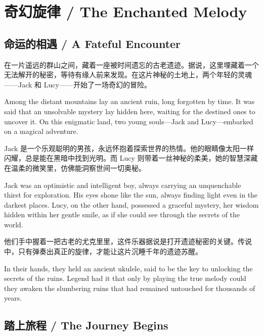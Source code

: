 \chapter*{奇幻旋律 / The Enchanted Melody}

\section*{命运的相遇 / A Fateful Encounter}

在一片遥远的群山之间，藏着一座被时间遗忘的古老遗迹。据说，这里埋藏着一个无法解开的秘密，等待有缘人前来发现。在这片神秘的土地上，两个年轻的灵魂——Jack 和 Lucy——开始了一场奇幻的冒险。

\begin{flushright}
Among the distant mountains lay an ancient ruin, long forgotten by time. It was said that an unsolvable mystery lay hidden here, waiting for the destined ones to uncover it. On this enigmatic land, two young souls—Jack and Lucy—embarked on a magical adventure.
\end{flushright}

Jack 是一个乐观聪明的男孩，永远怀抱着探索世界的热情。他的眼睛像太阳一样闪耀，总是能在黑暗中找到光明。而 Lucy 则带着一丝神秘的柔美，她的智慧深藏在温柔的微笑里，仿佛能洞察世间一切奥秘。

\begin{flushright}
Jack was an optimistic and intelligent boy, always carrying an unquenchable thirst for exploration. His eyes shone like the sun, always finding light even in the darkest places. Lucy, on the other hand, possessed a graceful mystery, her wisdom hidden within her gentle smile, as if she could see through the secrets of the world.
\end{flushright}

他们手中握着一把古老的尤克里里，这件乐器据说是打开遗迹秘密的关键。传说中，只有弹奏出真正的旋律，才能让这片沉睡千年的遗迹苏醒。

\begin{flushright}
In their hands, they held an ancient ukulele, said to be the key to unlocking the secrets of the ruins. Legend had it that only by playing the true melody could they awaken the slumbering ruins that had remained untouched for thousands of years.
\end{flushright}

\section*{踏上旅程 / The Journey Begins}

